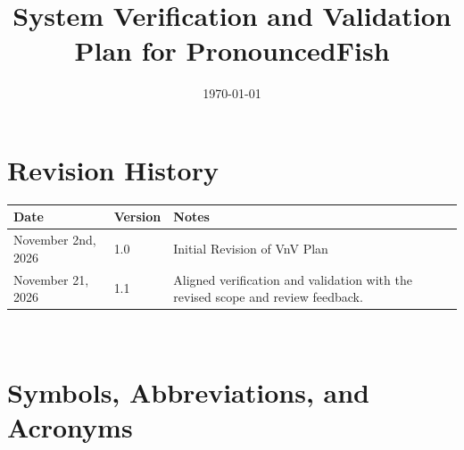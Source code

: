 \documentclass[12pt, titlepage]{article}
\begin{document}
\title{System Verification and Validation Plan for PronouncedFish}
\author{\authname}
\date{\today}
	
\maketitle


\section*{Revision History}

\begin{tabularx}{\textwidth}{p{3cm}p{2cm}X}
\toprule {\bf Date} & {\bf Version} & {\bf Notes}\\
\midrule
November 2nd, 2026 & 1.0 & Initial Revision of VnV Plan\\
November 21, 2026 & 1.1 & Aligned verification and validation with the revised scope and review feedback. \\
\bottomrule
\end{tabularx}

~\\

\newpage

\tableofcontents

\listoftables

\newpage

\section{Symbols, Abbreviations, and Acronyms}

\renewcommand{\arraystretch}{1.2}
\end{document}
